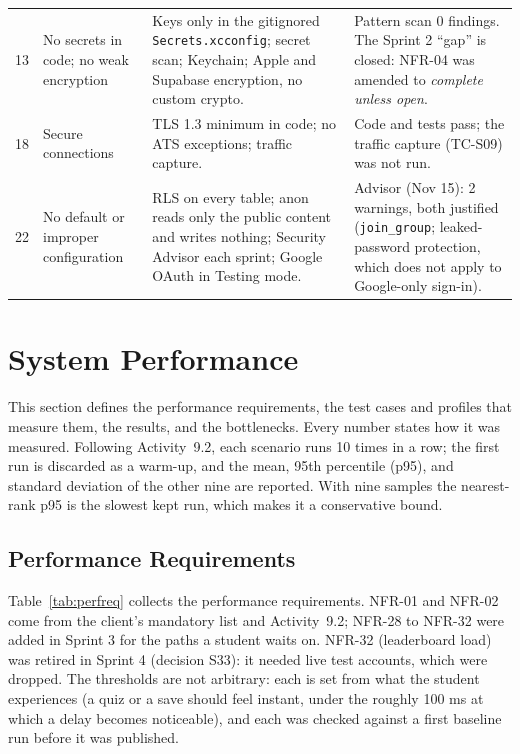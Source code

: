 \documentclass[12pt,letterpaper]{article}
\begin{document}
\begin{xltabular}{\textwidth}{@{}l L{2.5cm} Y L{4.2cm}@{}}
13 & No secrets in code; no weak encryption & Keys only in the gitignored \texttt{Secrets.xcconfig}; secret scan; Keychain; Apple and Supabase encryption, no custom crypto. & Pattern scan 0 findings. The Sprint 2 ``gap'' is closed: NFR-04 was amended to \emph{complete unless open}. \\
18 & Secure connections & TLS 1.3 minimum in code; no ATS exceptions; traffic capture. & Code and tests pass; the traffic capture (TC-S09) was not run. \\
22 & No default or improper configuration & RLS on every table; anon reads only the public content and writes nothing; Security Advisor each sprint; Google OAuth in Testing mode. & Advisor (Nov 15): 2 warnings, both justified (\texttt{join\_group}; leaked-password protection, which does not apply to Google-only sign-in). \\
\end{xltabular}

\section{System Performance}\label{sec:performance}
This section defines the performance requirements, the test cases and profiles that
measure them, the results, and the bottlenecks. Every number states how it was
measured. Following Activity~9.2, each scenario runs 10 times in a row; the first run
is discarded as a warm-up, and the mean, 95th percentile (p95), and standard deviation
of the other nine are reported. With nine samples the nearest-rank p95 is the slowest
kept run, which makes it a conservative bound.

\subsection{Performance Requirements}
Table~\ref{tab:perfreq} collects the performance requirements. NFR-01 and NFR-02 come
from the client's mandatory list and Activity~9.2; NFR-28 to NFR-32 were added in
Sprint 3 for the paths a student waits on. NFR-32 (leaderboard load) was retired in Sprint 4
(decision S33): it needed live test accounts, which were dropped. The thresholds are not arbitrary: each is
set from what the student experiences (a quiz or a save should feel instant, under
the roughly 100 ms at which a delay becomes noticeable), and each was checked against a
first baseline run before it was published.
\end{document}
